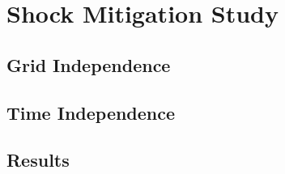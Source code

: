 \section{Shock Mitigation Study}

\subsection{Grid Independence}

\subsection{Time Independence}

\subsection{Results}